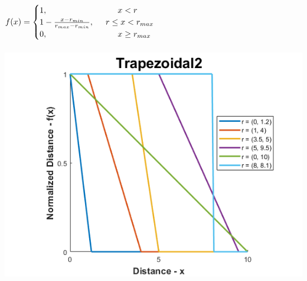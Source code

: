 \documentclass[12pt, a4paper, titlepage, openany]{book}
\begin{document}
\begin{description}[labelsep=1cm, labelwidth=2cm, nosep,,style=multiline,leftmargin=3cm]
\begin{description}[labelsep=14em, labelwidth=10em, nosep,style=multiline,leftmargin=6cm]
	\item[\texttt{"trapezoidal2"}]	  $f(x) = \begin{cases} 1,  \hspace{30mm}  x<r 
	\\ 1 - \frac{x-r_{min}}{r_{max} - r_{min}},  \hspace{5mm} r\le x<r_{max} 
	\\ 0,  \hspace{30mm}  x\ge r_{max} \end{cases}$\\ \ \\
		\includegraphics[scale=.5]{FuzzTrap2v1.png} \\ 
		

\end{description}
\end{description}
\end{document}
